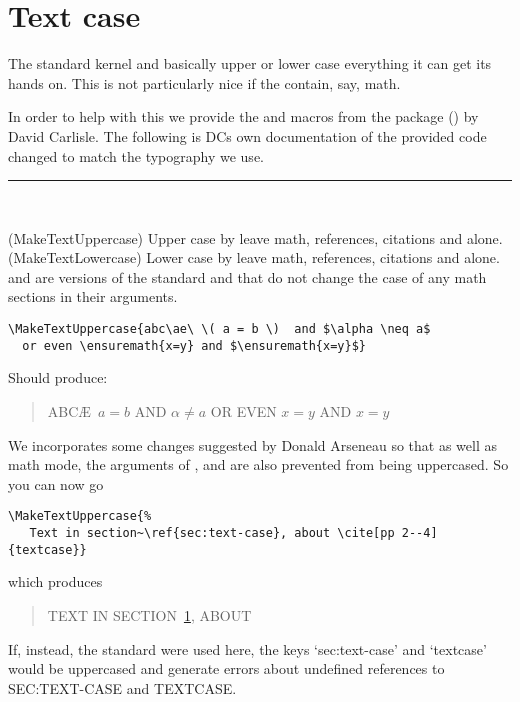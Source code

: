 \section{Text case}
\label{sec:text-case}

The standard kernel \cmd{\MakeUppercase} and
\cmd{\MakeLowercase} 
basically upper or lower case everything it can get its hands on. This
is not particularly nice if the  contain, say, math.

In order to help with this we provide the \cmd{\MakeTextUppercase} and
\cmd{\MakeTextLowercase} macros from the  package
(\cite{textcase}) by David Carlisle. The following is DCs own
documentation of the provided code changed to match the typography we
use.

\fancybreak{}

\begin{syntax}
  \cmd{\MakeTextUppercase}\\
  \cmd{\MakeTextLowercase}
\end{syntax}
\glossary(MakeTextUppercase)
  {}
  {Upper case  by leave math, references, citations and
     alone.}
\glossary(MakeTextLowercase)
  {}
  {Lower case  by leave math, references, citations and
     alone.}
\cmd{\MakeTextUppercase} and \cmd{\MakeTextLowercase} are versions of
the standard \cmd{\MakeUppercase} and \cmd{\MakeLowercase} that do not
change the case of any math sections in their arguments.
\begin{verbatim}
\MakeTextUppercase{abc\ae\ \( a = b \)  and $\alpha \neq a$ 
  or even \ensuremath{x=y} and $\ensuremath{x=y}$}
\end{verbatim}
Should produce:
\begin{quotation}
 ABC\AE\ \( a = b \)  AND $\alpha \neq a$ 
  OR EVEN \ensuremath{x=y} AND $\ensuremath{x=y}$
\end{quotation}

We incorporates some changes suggested by Donald Arseneau so that as
well as math mode, the arguments of \cmd{\cite}, \cmd{\label} and
\cmd{\ref} are also prevented from being uppercased.  So you can now
go
\begin{verbatim}
\MakeTextUppercase{%
   Text in section~\ref{sec:text-case}, about \cite[pp 2--4]{textcase}}
\end{verbatim}
which produces
\begin{quotation}
\MakeTextUppercase{%
   Text in section~\ref{sec:text-case}, about \cite[pp 2--4]{textcase}}
\end{quotation}
If, instead, the standard \cmd{\MakeUppercase} were used here, the keys
`sec:text-case' and `textcase' would be uppercased and generate errors about
undefined references to SEC:TEXT-CASE  and TEXTCASE.

